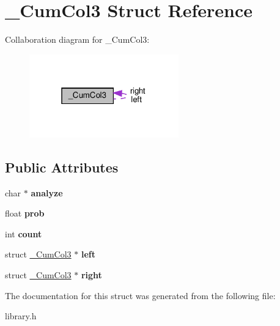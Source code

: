 \hypertarget{struct__CumCol3}{}\section{\+\_\+\+Cum\+Col3 Struct Reference}
\label{struct__CumCol3}


Collaboration diagram for \+\_\+\+Cum\+Col3\+:
\nopagebreak
\begin{figure}[H]
\begin{center}
\leavevmode
\includegraphics[width=183pt]{struct__CumCol3__coll__graph}
\end{center}
\end{figure}
\subsection*{Public Attributes}
\begin{DoxyCompactItemize}
\item 
\mbox{\label{struct__CumCol3_a95a7df966f21674b1f0cb8db80392f07}} 
char $\ast$ {\bfseries analyze}
\item 
\mbox{\label{struct__CumCol3_ac9a1ae1b2a650947393ade7c945dec08}} 
float {\bfseries prob}
\item 
\mbox{\label{struct__CumCol3_afc3e3ea07d91ef3b3f1711d33db466cb}} 
int {\bfseries count}
\item 
\mbox{\label{struct__CumCol3_af85f116f5acf778c909c173947408573}} 
struct \hyperlink{struct__CumCol3}{\+\_\+\+Cum\+Col3} $\ast$ {\bfseries left}
\item 
\mbox{\label{struct__CumCol3_afe4e71d5bd088eaac03ce49e1e054b4d}} 
struct \hyperlink{struct__CumCol3}{\+\_\+\+Cum\+Col3} $\ast$ {\bfseries right}
\end{DoxyCompactItemize}


The documentation for this struct was generated from the following file\+:\begin{DoxyCompactItemize}
\item 
library.\+h\end{DoxyCompactItemize}
